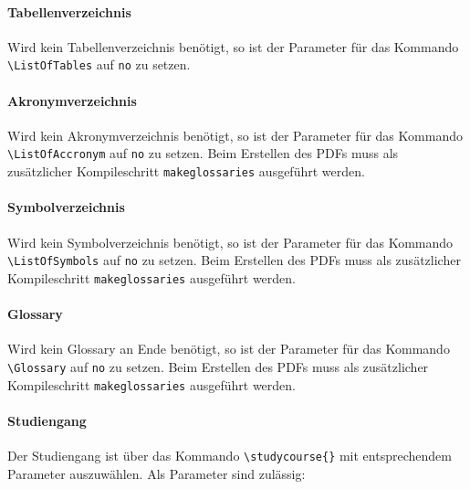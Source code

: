 \paragraph{Tabellenverzeichnis} Wird kein Tabellenverzeichnis benötigt, so ist der Parameter für das Kommando \texttt{\textbackslash ListOfTables} auf \texttt{no} zu setzen.

\paragraph{Akronymverzeichnis} Wird kein Akronymverzeichnis benötigt, so ist der Parameter für das Kommando \texttt{\textbackslash ListOfAccronym} auf \texttt{no} zu setzen. Beim Erstellen des PDFs muss als zusätzlicher Kompileschritt \texttt{makeglossaries} ausgeführt werden.

\paragraph{Symbolverzeichnis} Wird kein Symbolverzeichnis benötigt, so ist der Parameter für das Kommando \texttt{\textbackslash ListOfSymbols} auf \texttt{no} zu setzen. Beim Erstellen des PDFs muss als zusätzlicher Kompileschritt \texttt{makeglossaries} ausgeführt werden.

\paragraph{Glossary} Wird kein Glossary an Ende benötigt, so ist der Parameter für das Kommando \texttt{\textbackslash Glossary} auf \texttt{no} zu setzen. Beim Erstellen des PDFs muss als zusätzlicher Kompileschritt \texttt{makeglossaries} ausgeführt werden.

\paragraph{Studiengang} Der Studiengang ist über das Kommando
\texttt{\textbackslash studycourse\{\}} mit entsprechendem Parameter
auszuwählen. Als Parameter sind zulässig:

